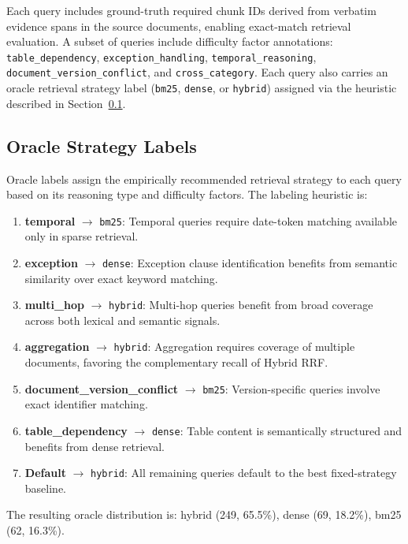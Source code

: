 Each query includes ground-truth required chunk IDs derived from verbatim evidence spans in the source documents, enabling exact-match retrieval evaluation. A subset of queries include difficulty factor annotations: \texttt{table\_dependency}, \texttt{exception\_handling}, \texttt{temporal\_reasoning}, \texttt{document\_version\_conflict}, and \texttt{cross\_category}. Each query also carries an oracle retrieval strategy label (\texttt{bm25}, \texttt{dense}, or \texttt{hybrid}) assigned via the heuristic described in Section~\ref{sec:method_oracle}.

\subsection{Oracle Strategy Labels}
\label{sec:method_oracle}

Oracle labels assign the empirically recommended retrieval strategy to each query based on its reasoning type and difficulty factors. The labeling heuristic is:

\begin{enumerate}
    \item \textbf{temporal} $\rightarrow$ \texttt{bm25}: Temporal queries require date-token matching available only in sparse retrieval.
    \item \textbf{exception} $\rightarrow$ \texttt{dense}: Exception clause identification benefits from semantic similarity over exact keyword matching.
    \item \textbf{multi\_hop} $\rightarrow$ \texttt{hybrid}: Multi-hop queries benefit from broad coverage across both lexical and semantic signals.
    \item \textbf{aggregation} $\rightarrow$ \texttt{hybrid}: Aggregation requires coverage of multiple documents, favoring the complementary recall of Hybrid RRF.
    \item \textbf{document\_version\_conflict} $\rightarrow$ \texttt{bm25}: Version-specific queries involve exact identifier matching.
    \item \textbf{table\_dependency} $\rightarrow$ \texttt{dense}: Table content is semantically structured and benefits from dense retrieval.
    \item \textbf{Default} $\rightarrow$ \texttt{hybrid}: All remaining queries default to the best fixed-strategy baseline.
\end{enumerate}

The resulting oracle distribution is: hybrid (249, 65.5\%), dense (69, 18.2\%), bm25 (62, 16.3\%).

